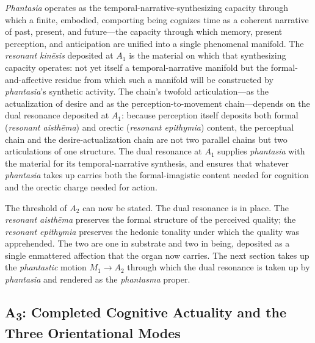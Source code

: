 \textit{Phantasia} operates as the temporal-narrative-synthesizing capacity through which a finite, embodied, comporting being cognizes time as a coherent narrative of past, present, and future---the capacity through which memory, present perception, and anticipation are unified into a single phenomenal manifold. The \textit{resonant kinēsis} deposited at $A_1$ is the material on which that synthesizing capacity operates: not yet itself a temporal-narrative manifold but the formal-and-affective residue from which such a manifold will be constructed by \textit{phantasia}'s synthetic activity. The chain's twofold articulation---as the actualization of desire and as the perception-to-movement chain---depends on the dual resonance deposited at $A_1$: because perception itself deposits both formal (\textit{resonant aisthēma}) and orectic (\textit{resonant epithymia}) content, the perceptual chain and the desire-actualization chain are not two parallel chains but two articulations of one structure. The dual resonance at $A_1$ supplies \textit{phantasia} with the material for its temporal-narrative synthesis, and ensures that whatever \textit{phantasia} takes up carries both the formal-imagistic content needed for cognition and the orectic charge needed for action.

The threshold of $A_2$ can now be stated. The dual resonance is in place. The \textit{resonant aisthēma} preserves the formal structure of the perceived quality; the \textit{resonant epithymia} preserves the hedonic tonality under which the quality was apprehended. The two are one in substrate and two in being, deposited as a single enmattered affection that the organ now carries. The next section takes up the \textit{phantastic} motion $M_1 \rightarrow A_2$ through which the dual resonance is taken up by \textit{phantasia} and rendered as the \textit{phantasma} proper.





\subsection*{A\textsubscript{3}: Completed Cognitive Actuality and the Three Orientational Modes}

